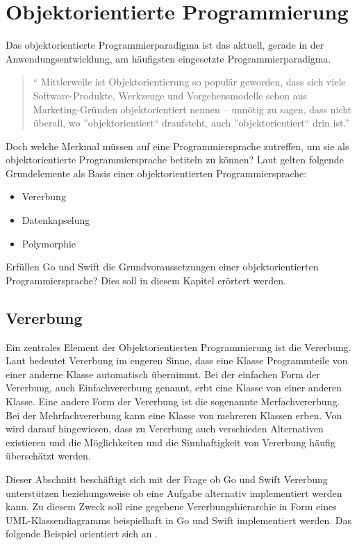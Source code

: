 \chapter{Objektorientierte Programmierung}
Das objektorientierte Programmierparadigma ist das aktuell, gerade in der Anwendungsentwicklung, am häufigsten eingesetzte Programmierparadigma.

\begin{quote}
\enquote{
Mittlerweile ist Objektorientierung so populär geworden, dass sich viele Software-Produkte, Werkzeuge und Vorgehensmodelle schon aus Marketing-Gründen objektorientiert nennen – unnötig zu sagen, dass nicht überall, wo ”objektorientiert“ draufsteht, auch ”objektorientiert“ drin ist.} 
\cite[S.16]{PoetzschHeffter.2009}
\end{quote}

Doch welche Merkmal müssen auf eine Programmiersprache zutreffen, um sie als objektorientierte Programmiersprache betiteln zu können?
Laut \cite{Lahres.2011} gelten folgende Grundelemente als Basis einer objektorientierten Programmiersprache:

\begin{itemize}
    \item Vererbung
    \item Datenkapselung
    \item Polymorphie
\end{itemize}

Erfüllen Go und Swift die Grundvoraussetzungen einer objektorientierten Programmiersprache? Dies soll in diesem Kapitel erörtert werden.

\section{Vererbung}
Ein zentrales Element der Objektorientierten Programmierung ist die Vererbung. 
Laut \cite[S. 145]{PoetzschHeffter.2009} bedeutet Vererbung im engeren Sinne, dass eine Klasse Programmteile von einer anderne Klasse automatisch übernimmt. 
Bei der einfachen Form der Vererbung, auch Einfachvererbung genannt, erbt eine Klasse von einer anderen Klasse.
Eine andere Form der Vererbung ist die sogenannte Merfachvererbung. 
Bei der Mehrfachvererbung kann eine Klasse von mehreren Klassen erben.
Von \cite[S.41]{Oestereich.1999} wird darauf hingewiesen, dass zu Vererbung auch verschieden Alternativen existieren und die Möglichkeiten und die Sinnhaftigkeit von Vererbung häufig überschätzt werden.


Dieser Abschnitt beschäftigt sich mit der Frage ob Go und Swift Vererbung unterstützen beziehungsweise ob eine Aufgabe alternativ implementiert werden kann.
Zu diesem Zweck soll eine gegebene Vererbungshierarchie in Form eines UML-Klassendiagramms beispielhaft in Go und Swift implementiert werden. 
Das folgende Beispiel orientiert sich an \cite[]{WilliamKennedy.2013}.

